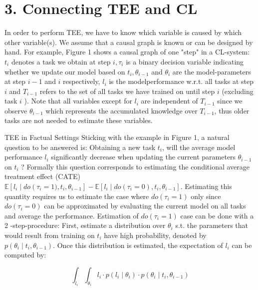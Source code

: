 \documentclass[10pt]{article}
\begin{document}
\section*{3. Connecting TEE and CL}
In order to perform TEE, we have to know which variable is caused by which other variable(s). We assume that a causal graph is known or can be designed by hand. For example, Figure 1 shows a causal graph of one "step" in a CL-system: $t_{i}$ denotes a task we obtain at step $i, \tau_{i}$ is a binary decision variable indicating whether we update our model based on $t_{i}, \theta_{i-1}$ and $\theta_{i}$ are the model-parameters at step $i-1$ and $i$ respectively, $l_{i}$ is the modelperformance w.r.t. all tasks at step $i$ and $T_{i-1}$ refers to the set of all tasks we have trained on until step $i$ (excluding task $i$ ). Note that all variables except for $l_{i}$ are independent of $T_{i-1}$ since we observe $\theta_{i-1}$ which represents the accumulated knowledge over $T_{i-1}$, thus older tasks are not needed to estimate these variables.

TEE in Factual Settings Sticking with the example in Figure 1, a natural question to be answered is: Obtaining a new task $t_{i}$, will the average model performance $l_{i}$ significantly decrease when updating the current parameters $\theta_{i-1}$ on $t_{i}$ ? Formally this question corresponds to estimating the conditional average treatment effect (CATE) $\mathbb{E}\left[l_{i} \mid d o\left(\tau_{i}=\right.\right. \left.1), t_{i}, \theta_{i-1}\right]-\mathbb{E}\left[l_{i} \mid d o\left(\tau_{i}=0\right), t_{i}, \theta_{i-1}\right]$. Estimating this quantity requires us to estimate the case where $d o\left(\tau_{i}=1\right)$ only since $d o\left(\tau_{i}=0\right)$ can be approximated by evaluating the current model on all tasks and average the performance. Estimation of $d o\left(\tau_{i}=1\right)$ case can be done with a 2 -step-procedure: First, estimate a distribution over $\theta_{i}$ s.t. the parameters that would result from training on $t_{i}$ have high probability, denoted by $p\left(\theta_{i} \mid t_{i}, \theta_{i-1}\right)$. Once this distribution is estimated, the expectation of $l_{i}$ can be computed by:


\begin{equation*}
\int_{l_{i}} \int_{\theta_{i}} l_{i} \cdot p\left(l_{i} \mid \theta_{i}\right) \cdot p\left(\theta_{i} \mid t_{i}, \theta_{i-1}\right) \tag{2}
\end{equation*}
\end{document}

